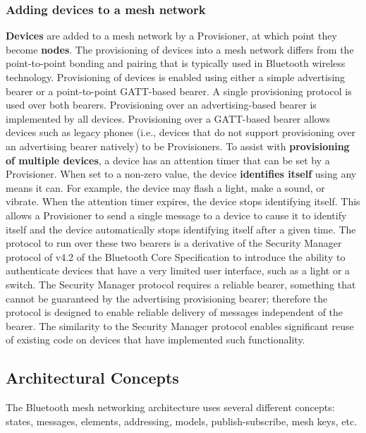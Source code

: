 \documentclass[\main/main.tex]{subfiles}
\begin{document}
\subsubsection{Adding devices to a mesh network}
\textbf{Devices} are added to a mesh network by a Provisioner, at which point they become \textbf{nodes}. The provisioning of devices into a mesh network differs from the point-to-point bonding and pairing that is typically used in Bluetooth wireless technology. Provisioning of devices is enabled using either a simple advertising bearer or a point-to-point GATT-based bearer. A single provisioning protocol is used over both bearers. Provisioning over an advertising-based bearer is implemented by all devices. Provisioning over a GATT-based bearer allows devices such as legacy phones (i.e., devices that do not support provisioning over an advertising bearer natively) to be Provisioners.
\newline\newline
To assist with \textbf{provisioning of multiple devices}, a device has an attention timer that can be set by a Provisioner. When set to a non-zero value, the device \textbf{identifies itself} using any means it can. For example, the device may flash a light, make a sound, or vibrate. When the attention timer expires, the device stops identifying itself. This allows a Provisioner to send a single message to a device to cause it to identify itself and the device automatically stops identifying itself after a given time.
\newline\newline
The protocol to run over these two bearers is a derivative of the Security Manager protocol of v4.2 of the Bluetooth Core Specification to introduce the ability to authenticate devices that have a very limited user interface, such as a light or a switch. The Security Manager protocol requires a reliable bearer, something that cannot be guaranteed by the advertising provisioning bearer; therefore the protocol is designed to enable reliable delivery of messages independent of the bearer. The similarity to the Security Manager protocol enables significant reuse of existing code on devices that have implemented such functionality.

\subsection{Architectural Concepts \cite{bluetooth_sig:mesh_profile_specification_1_0_1}}
The Bluetooth mesh networking architecture uses several different concepts: states, messages, elements, addressing, models, publish-subscribe, mesh keys, etc.
\end{document}
